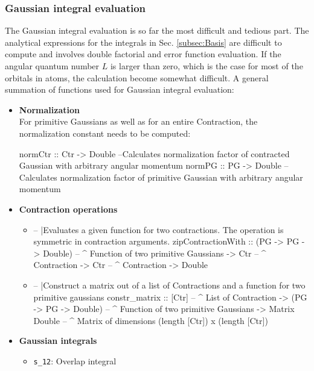 \documentclass[twoside,        %
			   11pt,			%
               BCOR10mm,       %
               ngerman,english  %
               ]{scrartcl}
\begin{document}
\subsubsection{Gaussian integral evaluation}
The Gaussian integral evaluation is so far the most difficult and tedious part. The analytical expressions for the integrals in Sec. \ref{subsec:Basis} are difficult to compute and involves double factorial and error function evaluation. If the angular quantum number $L$ is larger than zero, which is the case for most of the orbitals in atoms, the calculation become somewhat difficult. A general summation of functions used for Gaussian integral evaluation:
\begin{itemize}
\item \textbf{Normalization}\\
For primitive Gaussians as well as for an entire Contraction, the normalization constant needs to be computed:
\begin{code}
normCtr :: Ctr -> Double
--Calculates normalization factor of contracted Gaussian with arbitrary angular momentum
normPG :: PG -> Double
--Calculates normalization factor of primitive Gaussian with arbitrary angular momentum
\end{code}
\item \textbf{Contraction operations}
\begin{itemize}
\item
\begin{code}
-- |Evaluates a given function for two contractions. The operation is symmetric in contraction arguments.
zipContractionWith :: (PG -> PG -> Double) -- ^ Function of two primitive Gaussians 
			-> Ctr -- ^ Contraction
			-> Ctr -- ^ Contraction 
			-> Double
\end{code}
\item \begin{code}
-- |Construct a matrix out of a list of Contractions and a function for two primitive gaussians
constr_matrix :: [Ctr] -- ^ List of Contraction
		-> (PG -> PG -> Double) -- ^ Function of two primitive Gaussians
		-> Matrix Double -- ^ Matrix of dimensions (length [Ctr]) x (length [Ctr])
\end{code}\end{itemize} 
\item \textbf{Gaussian integrals}
\begin{itemize}
\item \texttt{s\_12}: Overlap integral\\
\begin{align*}

\end{align*}
\end{itemize}
\end{itemize}
\end{document}
